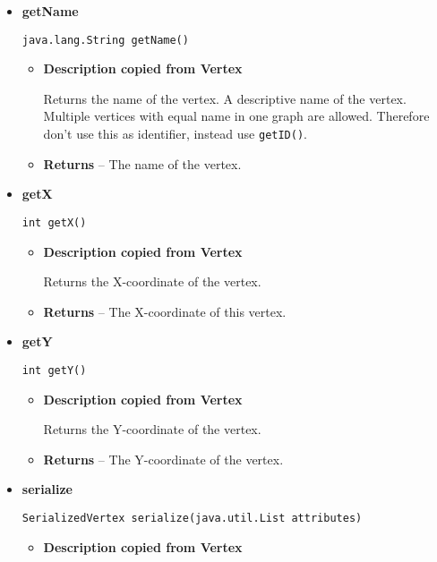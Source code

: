 {{{{{{{{{{{{{{{{{\begin{itemize}
{\begin{itemize}
{Returns the label of the vertex, that will be shown in the GUI. The label can be an empty string.
}
\item{{\bf  Returns} -- 
The label of the vertex 
}%
\end{itemize}
}%
\item{ 
{\bf  getName}\\
\begin{lstlisting}[frame=none]
java.lang.String getName()\end{lstlisting} %
\begin{itemize}
\item{
{\bf  Description copied from Vertex{\small {}} }

Returns the name of the vertex. A descriptive name of the vertex. Multiple vertices with equal name in one graph are allowed. Therefore don't use this as identifier, instead use \texttt{\small getID()}.
}
\item{{\bf  Returns} -- 
The name of the vertex. 
}%
\end{itemize}
}%
\item{ 
{\bf  getX}\\
\begin{lstlisting}[frame=none]
int getX()\end{lstlisting} %
\begin{itemize}
\item{
{\bf  Description copied from Vertex{\small {}} }

Returns the X-coordinate of the vertex.
}
\item{{\bf  Returns} -- 
The X-coordinate of this vertex. 
}%
\end{itemize}
}%
\item{ 
{\bf  getY}\\
\begin{lstlisting}[frame=none]
int getY()\end{lstlisting} %
\begin{itemize}
\item{
{\bf  Description copied from Vertex{\small {}} }

Returns the Y-coordinate of the vertex.
}
\item{{\bf  Returns} -- 
The Y-coordinate of the vertex. 
}%
\end{itemize}
}%
\item{ 
{\bf  serialize}\\
\begin{lstlisting}[frame=none]
SerializedVertex serialize(java.util.List attributes)\end{lstlisting} %
\begin{itemize}
\item{
{\bf  Description copied from Vertex{\small {}} }

}
\end{itemize}}
\end{itemize}}}}}}}}}}}}}}}}}}

